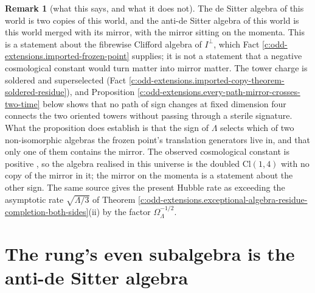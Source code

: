 \documentclass[11pt]{article}
\theoremstyle{definition}
\newtheorem{remark}[theorem]{Remark}
\theoremstyle{plain}
\providecommand{\Cl}{}\renewcommand{\Cl}{\mathrm{Cl}}
\begin{document}
\begin{remark}[what this says, and what it does not]\label{c:note.odd-extensions.what-says-what-it-does-not}
The de Sitter algebra of this world is two copies of this world, and the anti-de Sitter algebra of this world is this world merged with its mirror, with the mirror sitting on the momenta. This is a statement about the fibrewise Clifford algebra of $I^{\perp}$, which Fact \ref{c:odd-extensions.imported-frozen-point} supplies; it is not a statement that a negative cosmological constant would turn matter into mirror matter. The tower charge is soldered and superselected (Fact \ref{c:odd-extensions.imported-copy-theorem-soldered-residue}), and Proposition \ref{c:odd-extensions.every-path-mirror-crosses-two-time} below shows that no path of sign changes at fixed dimension four connects the two oriented towers without passing through a sterile signature. What the proposition does establish is that the sign of $\Lambda$ selects which of two non-isomorphic algebras the frozen point's translation generators live in, and that only one of them contains the mirror. The observed cosmological constant is positive \cite{Planck2018}, so the algebra realised in this universe is the doubled $\Cl(1,4)$ with no copy of the mirror in it; the mirror on the momenta is a statement about the other sign. The same source gives the present Hubble rate as exceeding the asymptotic rate $\sqrt{\Lambda/3}$ of Theorem \ref{c:odd-extensions.exceptional-algebra-residue-completion-both-sides}(ii) by the factor $\Omega_{\Lambda}^{-1/2}$.
\end{remark}

\section{The rung's even subalgebra is the anti-de Sitter algebra}
\end{document}
